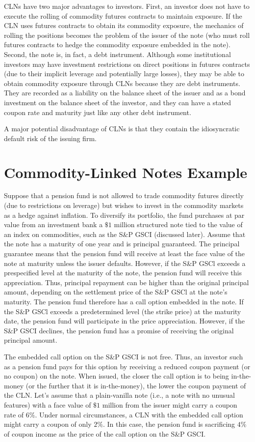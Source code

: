 \documentclass[11pt]{article}
\begin{document}
CLNs have two major advantages to investors. First, an investor does not have to execute the rolling of commodity futures contracts to maintain exposure. If the CLN uses futures contracts to obtain its commodity exposure, the mechanics of rolling the positions becomes the problem of the issuer of the note (who must roll futures contracts to hedge the commodity exposure embedded in the note). Second, the note is, in fact, a debt instrument. Although some institutional investors may have investment restrictions on direct positions in futures contracts (due to their implicit leverage and potentially large losses), they may be able to obtain commodity exposure through CLNs because they are debt instruments. They are recorded as a liability on the balance sheet of the issuer and as a bond investment on the balance sheet of the investor, and they can have a stated coupon rate and maturity just like any other debt instrument.

A major potential disadvantage of CLNs is that they contain the idiosyncratic default risk of the issuing firm.

\section*{Commodity-Linked Notes Example}
Suppose that a pension fund is not allowed to trade commodity futures directly (due to restrictions on leverage) but wishes to invest in the commodity markets as a hedge against inflation. To diversify its portfolio, the fund purchases at par value from an investment bank a $\$ 1$ million structured note tied to the value of an index on commodities, such as the S\&P GSCI (discussed later). Assume that the note has a maturity of one year and is principal guaranteed. The principal guarantee means that the pension fund will receive at least the face value of the note at maturity unless the issuer defaults. However, if the S\&P GSCl exceeds a prespecified level at the maturity of the note, the pension fund will receive this appreciation. Thus, principal repayment can be higher than the original principal amount, depending on the settlement price of the S\&P GSCl at the note's maturity. The pension fund therefore has a call option embedded in the note. If the S\&P GSCl exceeds a predetermined level (the strike price) at the maturity date, the pension fund will participate in the price appreciation. However, if the S\&P GSCI declines, the pension fund has a promise of receiving the original principal amount.

The embedded call option on the S\&P GSCI is not free. Thus, an investor such as a pension fund pays for this option by receiving a reduced coupon payment (or no coupon) on the note. When issued, the closer the call option is to being in-the-money (or the further that it is in-the-money), the lower the coupon payment of the CLN. Let's assume that a plain-vanilla note (i.e., a note with no unusual features) with a face value of $\$ 1$ million from the issuer might carry a coupon rate of $6 \%$. Under normal circumstances, a CLN with the embedded call option might carry a coupon of only $2 \%$. In this case, the pension fund is sacrificing $4 \%$ of coupon income as the price of the call option on the S\&P GSCI.
\end{document}
